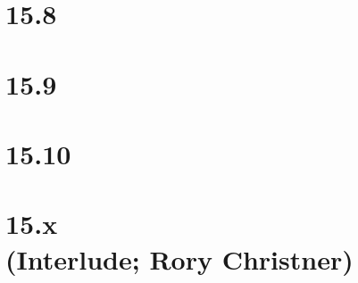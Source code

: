  \chapter{15.8}

 \chapter{15.9}

 \chapter{15.10}

 \chapter[15.x (Interlude; Rory Christner)]{15.x\\(Interlude; Rory Christner)}















